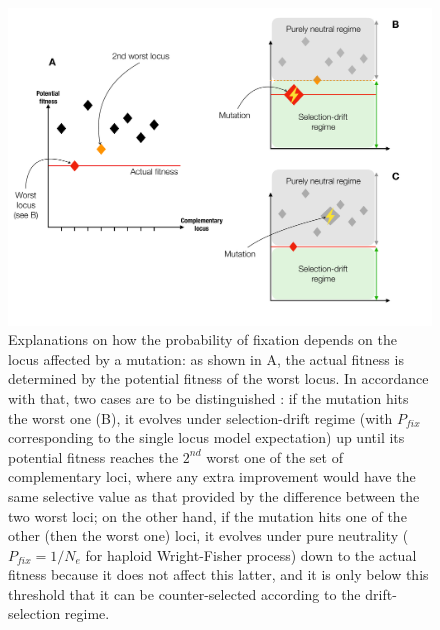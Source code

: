 \begin{figure}[h!]
    \centering
    \includegraphics[scale=0.45,trim=0cm 1cm 0cm 1cm,clip]{pics/Epistasis/Selection-Complementary-Epistasis.pdf}
    \caption{Explanations on how the probability of fixation depends on the locus affected by a mutation: as shown in A, the actual fitness is determined by the potential fitness of the worst locus. In accordance with that, two cases are to be distinguished : if the mutation hits the worst one (B), it evolves under selection-drift regime (with $P_{fix}$ corresponding to the single locus model expectation) up until its potential fitness reaches the $2^{nd}$ worst one of the set of complementary loci, where any extra improvement would have the same selective value as that provided by the difference between the two worst loci; on the other hand, if the mutation hits one of the other (then the worst one) loci, it evolves under pure neutrality ($P_{fix}=1/N_e$ for haploid Wright-Fisher process) down to the actual fitness because it does not affect this latter, and it is only below this threshold that it can be counter-selected according to the drift-selection regime.}
    \label{fig:CompEpi-FixProb}
\end{figure}

